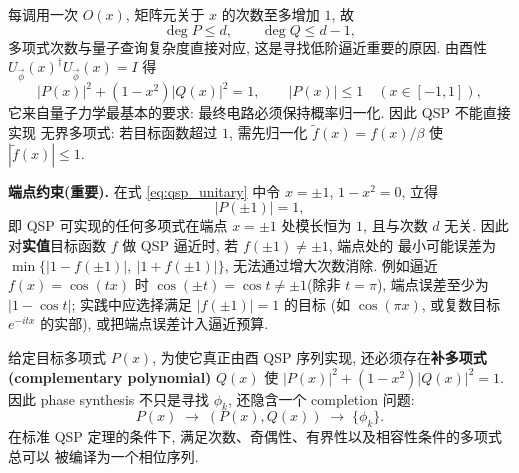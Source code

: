\documentclass[utf8]{article} %
\numberwithin{equation}{section}   %
\newtheorem{Note}{\hskip 2em {\color{red} 注}}[subsection]
\begin{document}
\begin{Note}[次数、奇偶性与酉性约束]
    每调用一次 $O(x)$, 矩阵元关于 $x$ 的次数至多增加 $1$, 故
    \begin{equation}
        \deg P \le d, \qquad \deg Q \le d-1,
    \end{equation}
    多项式次数与量子查询复杂度直接对应, 这是寻找低阶逼近重要的原因. 由酉性
    $U_{\vec\phi}(x)^\dagger U_{\vec\phi}(x) = I$ 得
    \begin{equation}
        |P(x)|^2 + (1-x^2)|Q(x)|^2 = 1,
        \qquad |P(x)| \le 1 \quad (x \in [-1,1]),
        \label{eq:qsp_unitary}
    \end{equation}
    它来自量子力学最基本的要求: 最终电路必须保持概率归一化. 因此 QSP 不能直接实现
    无界多项式: 若目标函数超过 $1$, 需先归一化 $\widetilde f(x) = f(x)/\beta$ 使
    $|\widetilde f(x)| \le 1$.

    \textbf{端点约束(重要).} 在式 \eqref{eq:qsp_unitary} 中令 $x = \pm 1$,
    $1-x^2 = 0$, 立得
    \begin{equation}
        |P(\pm 1)| = 1,
    \end{equation}
    即 QSP 可实现的任何多项式在端点 $x = \pm 1$ 处模长恒为 $1$, 且与次数 $d$ 无关.
    因此对\textbf{实值}目标函数 $f$ 做 QSP 逼近时, 若 $f(\pm 1) \neq \pm 1$, 端点处的
    最小可能误差为 $\min\big\{|1-f(\pm1)|,\ |1+f(\pm1)|\big\}$, 无法通过增大次数消除.
    例如逼近 $f(x) = \cos(tx)$ 时 $\cos(\pm t) = \cos t \neq \pm 1$(除非 $t = \pi$),
    端点误差至少为 $|1 - \cos t|$; 实践中应选择满足 $|f(\pm 1)| = 1$ 的目标
    (如 $\cos(\pi x)$, 或复数目标 $e^{-itx}$ 的实部), 或把端点误差计入逼近预算.
\end{Note}

\begin{Note}
    给定目标多项式 $P(x)$, 为使它真正由酉 QSP 序列实现, 还必须存在\textbf{补多项式
    (complementary polynomial)} $Q(x)$ 使 $|P(x)|^2 + (1-x^2)|Q(x)|^2 = 1$. 因此
    phase synthesis 不只是寻找 $\phi_k$, 还隐含一个 completion 问题:
    \begin{equation}
        P(x) \;\longrightarrow\; (P(x), Q(x)) \;\longrightarrow\; \{\phi_k\}.
    \end{equation}
    在标准 QSP 定理的条件下, 满足次数、奇偶性、有界性以及相容性条件的多项式总可以
    被编译为一个相位序列.
\end{Note}
\end{document}
